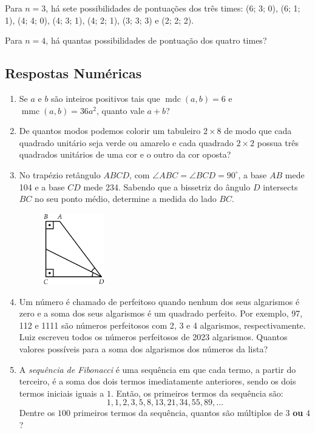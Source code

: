 \documentclass[12pt]{article}
\begin{document}
\begin{enumerate}[label=\textbf{\arabic*.}]
          Para \(n=3\), há sete possibilidades de pontuações dos três times: (6; 3; 0), (6; 1; 1), (4; 4; 0), (4; 3; 1), (4; 2; 1), (3; 3; 3)
          e (2; 2; 2).

          Para \(n=4\), há quantas possibilidades de pontuação dos quatro times?
      \end{enumerate}
    \subsection{Respostas Numéricas}
      \begin{enumerate}[label=\textbf{\arabic*.}, start=16]
      \item Se \(a\) e \(b\) são inteiros positivos tais que \(\operatorname{mdc}(a,b) = 6\) e \(\operatorname{mmc}(a,b) = 36a^2\), quanto vale \(a+b\)?
      \item De quantos modos podemos colorir um tabuleiro \(2\times8\) de modo que cada quadrado unitário seja verde ou amarelo e cada 
        quadrado \(2\times2\) possua três quadrados unitários de uma cor e o outro da cor oposta?
      \item No trapézio retângulo \(ABCD\), com \(\angle ABC = \angle BCD = 90^\circ\), a base \(AB\) mede 104 e a base \(CD\) mede 234.
        Sabendo que a bissetriz do ângulo \(D\) intersects \(BC\) no seu ponto médio, determine a medida do lado \(BC\).
        \begin{figure}[h]
          \centering
          \includegraphics[width=0.25\textwidth]{third.png}
        \end{figure}
      \item Um número é chamado de perfeitoso quando nenhum dos seus algarismos é zero e a soma dos seus algarismos é um quadrado perfeito.
        Por exemplo, 97, 112 e 1111 são números perfeitosos com 2, 3 e 4 algarismos, respectivamente. Luiz escreveu todos os números 
        perfeitosos de 2023 algarismos. Quantos valores possíveis para a soma dos algarismos dos números da lista?
      \item A \textit{sequência de Fibonacci} é uma sequência em que cada termo, a partir do terceiro, é a soma dos dois termos imediatamente
        anteriores, sendo os dois termos iniciais iguais a $1$. Então, os primeiros termos da sequência são:
        \[
          1, 1, 2, 3, 5, 8, 13, 21, 34, 55, 89, \dots
        \]
        Dentre os $100$ primeiros termos da sequência, quantos são múltiplos de $3$ \textbf{ou} $4$?
    \end{enumerate}
\end{document}

